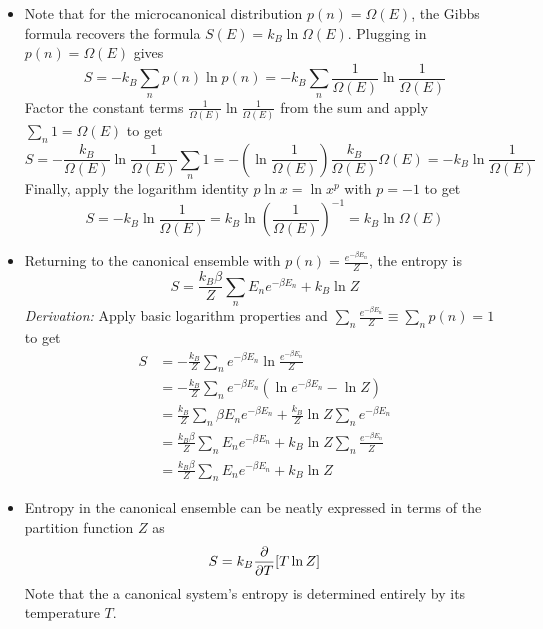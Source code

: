 \documentclass[11pt, a4paper]{article}
\begin{document}
\begin{itemize}
	\item Note that for the microcanonical distribution $ p(n) = \Omega(E) $, the Gibbs formula recovers the formula $ S(E) = k_{B} \ln \Omega (E) $. Plugging in $ p(n) = \Omega(E) $ gives
	\begin{equation*}
		S = - k_{B} \sum_{n}p(n)\ln p(n) = - k_{B} \sum_{n} \frac{1}{\Omega(E)} \ln \frac{1}{\Omega(E)}
	\end{equation*}
	Factor the constant terms $  \frac{1}{\Omega(E)} \ln \frac{1}{\Omega(E)} $ from the sum and apply $ \sum_{n} 1 = \Omega(E) $ to get
	\begin{equation*}
		S = - \frac{k_{B}}{\Omega(E)} \ln \frac{1}{\Omega(E)} \sum_{n} 1 = -\left(\ln \frac{1}{\Omega(E)}\right) \frac{k_{B}}{\Omega(E)} \Omega(E) = -k_{B} \ln \frac{1}{\Omega(E)}
	\end{equation*}
	Finally, apply the logarithm identity $ p \ln x = \ln x^{p} $ with $ p = -1 $ to get
	\begin{equation*}
		S = -k_{B} \ln \frac{1}{\Omega(E)} = k_{B} \ln \left(\frac{1}{\Omega(E)}\right)^{-1} = k_{B} \ln \Omega (E)
	\end{equation*}
	
	\item Returning to the canonical ensemble with $ p(n) = \frac{e^{-\beta E_{n}}}{Z} $, the entropy is
	\begin{equation*}
		S = \frac{k_{B}\beta}{Z}\sum_{n} E_{n}e^{-\beta E_{n}} + k_{B}\ln Z
	\end{equation*}
	\textit{Derivation:} Apply basic logarithm properties and $ \sum_{n} \frac{e^{-\beta E_{n}}}{Z} \equiv \sum_{n} p(n) = 1 $ to get
	\begin{align*}
		S &= - \frac{k_{B}}{Z} \sum_{n}e^{-\beta E_{n}}\ln \frac{e^{-\beta E_{n}}}{Z}\\
		&= - \frac{k_{B}}{Z} \sum_{n}e^{-\beta E_{n}}  \left (\ln e^{-\beta E_{n}} -\ln Z\right )\\
		&= \frac{k_{B}}{Z} \sum_{n} \beta E_{n} e^{-\beta E_{n}} +  \frac{k_{B}}{Z} \ln Z  \sum_{n}  e^{-\beta E_{n}}\\
		&= \frac{k_{B}\beta}{Z} \sum_{n} E_{n} e^{-\beta E_{n}} + k_{B} \ln Z  \sum_{n}  \frac{e^{-\beta E_{n}}}{Z}\\
		&=\frac{k_{B}\beta}{Z}\sum_{n} E_{n}e^{-\beta E_{n}} + k_{B}\ln Z
	\end{align*}
	
	\item Entropy in the canonical ensemble can be neatly expressed in terms of the partition function $ Z $ as
	\begin{equation*}
		S = k_{B} \pdv{}{T}[T \ln Z]
	\end{equation*}
	Note that the a canonical system's entropy is determined entirely by its temperature $ T $.
	
\end{itemize}
\end{document}
